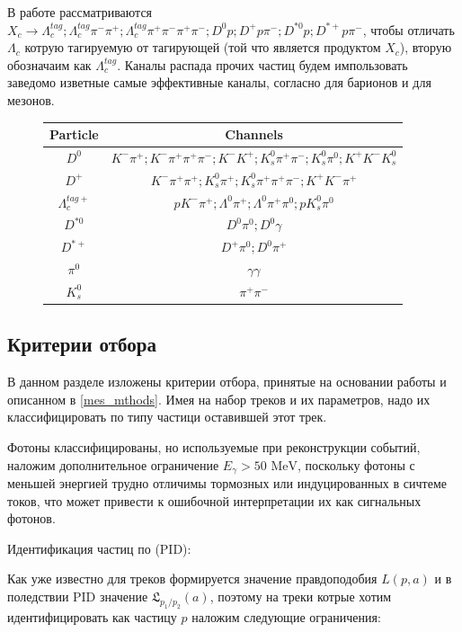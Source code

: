В работе рассматриваются $X_c \to \Lambda^{tag}_c; \Lambda^{tag}_c \pi^- \pi^+; \Lambda^{tag}_c \pi^+ \pi^- \pi^+ \pi^-; D^0 p; D^+ p \pi^-; D^{*0} p; D^{*+} p \pi^- $, 
чтобы отличать $\Lambda_c$ котрую тагируемую от тагирующей (той что является продуктом $X_c$), вторую обозначаим как $\Lambda^{tag}_c$.
Каналы распада прочих частиц будем импользовать заведомо изветные самые эффективные каналы, согласно \cite{PDGTablesBar} для барионов и \cite{PDGTablesMes} для мезонов.
\begin{figure}[h]
    \centering
    \begin{tabular}{c|c}
        Particle & Channels \\ \hline
        $D^0$ & $K^- \pi^+; K^- \pi^+ \pi^+ \pi^-; K^- K^+; K^0_s \pi^+ \pi^-; K^0_s \pi^0; K^+ K^- K_s^0$ \\
        $D^+$ & $K^- \pi^+ \pi^+; K^0_s \pi^+; K^0_s \pi^+ \pi^+ \pi^-; K^+ K^- \pi^+$ \\
        $\Lambda^{tag+}_c$ & $pK^-\pi^+; \Lambda^0 \pi^+; \Lambda^0 \pi^+ \pi^0; p K_s^0 \pi^0$ \\
        $D^{*0}$ & $D^0 \pi^0; D^0 \gamma$ \\
        $D^{*+}$ & $D^+ \pi^0; D^0 \pi^+$ \\
        $\pi^0$ & $\gamma \gamma$ \\
        $K_s^0$ & $\pi^+ \pi^-$
    \end{tabular}
    \label{fig:part_channels}
\end{figure}

\subsection{Критерии отбора}

В данном разделе изложены критерии отбора, принятые на основании работы \cite*{BelleDetector2002} и описанном в \ref{mes_mthods}. 
Имея на набор треков и их параметров, надо их классифицировать по типу частици оставившей этот трек. 

\newdot Фотоны классифицированы, но используемые при реконструкции событий, наложим дополнительное ограничение $E_\gamma > 50 \text{ MeV}$, поскольку фотоны с меньшей энергией трудно отличимы тормозных или индуцированных в сичтеме токов, 
что может привести к ошибочной интерпретации их как сигнальных фотонов.

\newdot Идентификация частиц по (PID):

Как уже известно для треков формируется значение правдоподобия $L(p,a)$ 
и в поледствии PID значение $\mathfrak{L}_{p_1/p_2}(a)$, поэтому на треки котрые хотим 
идентифицировать как частицу $p$ наложим следующие ограничения:

